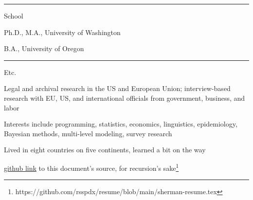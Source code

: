 \documentclass[letterpaper, english, 11pt]{article}
\newenvironment{packed_itemize}{
	\begin{itemize}
		\setlength{\itemsep}{1pt}
		\setlength{\parskip}{2pt}
		\setlength{\parsep}{2pt}
	} {\end{itemize}
}
\begin{document}
\vspace{6pt}
\hrule

School

\begin{footnotesize}
	\begin{packed_itemize}
		\item Ph.D., M.A., University of Washington
		\item B.A., University of Oregon
	\end{packed_itemize}
\end{footnotesize}

\vspace{6pt}
\hrule

Etc.

\begin{footnotesize}
	\begin{packed_itemize}
		\item Legal and archival research in the US and European Union; interview-based research with EU, US, and international officials from government, business, and labor 
		\item Interests include programming, statistics, economics, linguistics, epidemiology, Bayesian methods, multi-level modeling, survey research
		\item Lived in eight countries on five continents, learned a bit on the way
		\item \href{https://github.com/rsspdx/resume/blob/main/sherman-resume.tex}{github link} to this document's source, for recursion's sake\footnote{https://github.com/rsspdx/resume/blob/main/sherman-resume.tex}
	\end{packed_itemize}
\end{footnotesize} 
\end{document}
